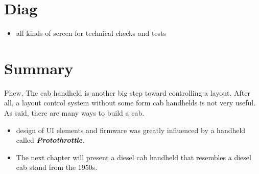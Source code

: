 \section{Diag}

\begin{itemize}
\begin{itemize}
\item all kinds of screen for technical checks and tests
\end{itemize}
\end{itemize}

\section{Summary}

Phew. The cab handheld is another big step toward controlling a layout. After all, a layout control system without some form cab handhelds is not very useful. As said, there are many ways to build a cab.
\begin{itemize}
\begin{itemize}
\item design of UI elements and firmware was greatly influenced by a handheld called \textbf{\textit{Protothrottle}}.
\item The next chapter will present a diesel cab handheld that resembles a diesel cab stand from the 1950s.
\end{itemize}
\end{itemize}
